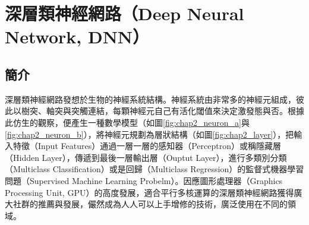 \section{深層類神經網路（Deep Neural Network, DNN）}    
\subsection{簡介}
深層類神經網路發想於生物的神經系統結構。神經系統由非常多的神經元組成，彼此以樹突、軸突與突觸連結，每顆神經元自己有活化閾值來決定激發態與否。根據此仿生的觀察，便產生一種數學模型（如圖\ref{fig:chap2_neuron_a}與\ref{fig:chap2_neuron_b}），將神經元規劃為層狀結構（如圖\ref{fig:chap2_layer}），把輸入特徵（Input Features）通過一層一層的感知器（Perceptron）或稱隱藏層（Hidden Layer），傳遞到最後一層輸出層（Ouptut Layer），進行多類別分類（Multiclass Classification）或是回歸（Multiclass Regression）的監督式機器學習問題（Supervised Machine Learning Probelm）。因應圖形處理器（Graphics Processing Unit, GPU）的高度發展，適合平行多核運算的深層類神經網路獲得廣大社群的推薦與發展，儼然成為人人可以上手增修的技術，廣泛使用在不同的領域。

